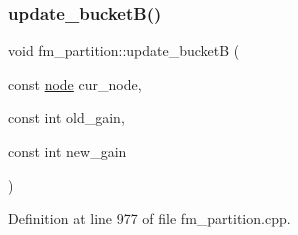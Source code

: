 \subsubsection{\texorpdfstring{update\+\_\+bucket\+B()}{update\_bucketB()}}
{\footnotesize\ttfamily void fm\+\_\+partition\+::update\+\_\+bucketB (\begin{DoxyParamCaption}\item[{const \mbox{\hyperlink{classnode}{node}}}]{cur\+\_\+node,  }\item[{const int}]{old\+\_\+gain,  }\item[{const int}]{new\+\_\+gain }\end{DoxyParamCaption})\hspace{0.3cm}{\ttfamily [protected]}}



Definition at line 977 of file fm\+\_\+partition.\+cpp.


